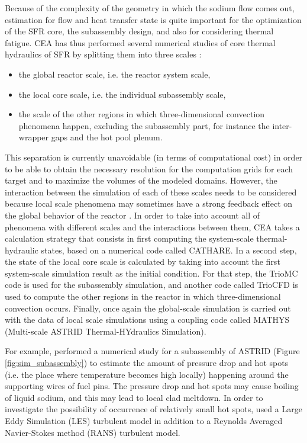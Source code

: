     Because of the complexity of the geometry in which the sodium flow comes out, estimation for flow and heat transfer state is quite important for the
optimization of the SFR core, the subassembly design, and also for considering thermal fatigue. CEA has thus performed several numerical studies of core thermal
hydraulics of SFR by splitting them into three scales \citep{Gerschenfeld2017DevelopmentandValidation}:
    \begin{itemize}
        \item the global reactor scale, i.e. the reactor system scale,
        \item the local core scale, i.e. the individual subassembly scale,
        \item the scale of the other regions in which three-dimensional convection phenomena happen, excluding the subassembly part,
for instance the inter-wrapper gaps and the hot pool plenum.
    \end{itemize}
    This separation is currently unavoidable (in terms of computational cost) in order to be able to obtain the necessary resolution for the computation grids for each target and to maximize the volumes of the modeled domains.
    However, the interaction between the simulation of each of these scales needs to be considered because local scale phenomena may sometimes have a strong feedback effect
on the global behavior of the reactor \parencite{Gerschenfeld2017DevelopmentandValidation}.
In order to take into account all of phenomena with different scales and the interactions between them, CEA takes a calculation strategy that consists in
first computing the system-scale thermal-hydraulic states, based on a numerical code called CATHARE.
In a second step, the state of the local core scale is calculated
by taking into account the first system-scale simulation result as the initial condition.
For that step, the TrioMC code is used for the subassembly simulation, and another code called TrioCFD is used to compute the other regions in the reactor
in which three-dimensional convection occurs. Finally, once again the global-scale simulation is carried out with the data of local scale simulations
using a coupling code called MATHYS (Multi-scale ASTRID Thermal-HYdraulics Simulation).

    For example, \textcite{Saxena2014Thermalhydraulicnumerical} performed a numerical study for a subassembly of ASTRID (Figure \ref{fig:sim_subassembly})
to estimate the amount of pressure drop and hot spots (i.e. the place where temperature becomes high locally) happening around the supporting wires of fuel
pins. The pressure drop and hot spots may cause boiling of liquid sodium, and this may lead to local clad meltdown. In order to investigate the possibility of
occurrence of relatively small hot spots, \textcite{Saxena2014Thermalhydraulicnumerical} used a Large Eddy Simulation (LES) turbulent model in addition to a
Reynolds Averaged Navier-Stokes method (RANS) turbulent model.

